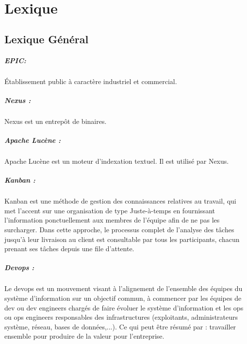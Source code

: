 \chapter{Lexique}

\section{Lexique Général}

\paragraph{EPIC: }
\label{lexi:epic}
Établissement public à caractère industriel et commercial.

\paragraph{Nexus : }
\label{lexi:nexus}
Nexus est un entrepôt de binaires.

\paragraph{Apache Lucène :}
\label{lexi:lucene}
Apache Lucène est un moteur d'indexation textuel. Il est utilisé par Nexus.

\paragraph{Kanban : }
\label{lexi:kanban}
Kanban est une méthode de gestion des connaissances relatives au travail,
qui met l’accent sur une organisation de type Juste-à-temps en fournissant l'information ponctuellement aux membres de l'équipe afin de ne pas les surcharger.
Dans cette approche, le processus complet de l'analyse des tâches jusqu’à leur livraison au client est consultable par tous les participants,
chacun prenant ses tâches depuis une file d'attente.

\paragraph{Devops : }
\label{lexi:devops}
Le devops est un mouvement visant à l'alignement de l'ensemble des équipes du système d'information sur un objectif commun,
à commencer par les équipes de dev ou dev engineers chargés de faire évoluer le système d'information et les ops ou ops engineers responsables des infrastructures (exploitants, administrateurs système, réseau, bases de données,...).
Ce qui peut être résumé par : travailler ensemble pour produire de la valeur pour l'entreprise.

